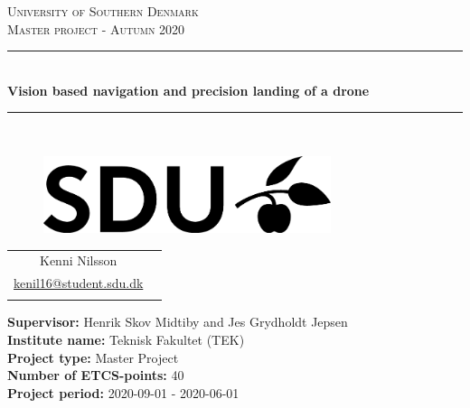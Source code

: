 \documentclass[Report.tex]{subfiles}
\begin{document}
\begin{titlepage}
\begin{center}
\textsc{\LARGE University of Southern Denmark}\\[1.5cm]

\textsc{\large Master project - Autumn 2020}\\[0.5cm]
\rule{\linewidth}{0.5mm}\\[0.2cm]
{ \LARGE \bfseries Vision based navigation and precision landing of a drone \\[0.4cm]}
\rule{\linewidth}{0.5mm}\\[1.2cm]

\vspace{2.5cm}

    \begin{figure}[h!]
    \centering
    \includegraphics[width=0.75\textwidth]{../Figures/SDUlogo.png}
    \label{fig:SDUlogo}\\
    [2.5cm]
    \end{figure}


\begin{tabular}{cc}
	\cline{1-1}
	\\
    Kenni Nilsson\\
    \href{mailto:kenil16@student.sdu.dk}{kenil16@student.sdu.dk} \\
	\\	
\end{tabular}	

\vfill

\textbf{Supervisor:} Henrik Skov Midtiby and Jes Grydholdt Jepsen \\
\textbf{Institute name:} Teknisk Fakultet (TEK) \\
\textbf{Project type:} Master Project \\
\textbf{Number of ETCS-points:} 40 \\
\textbf{Project period:} 2020-09-01 - 2020-06-01
\mbox{}\\

\end{center}
\end{titlepage}
\end{document}
